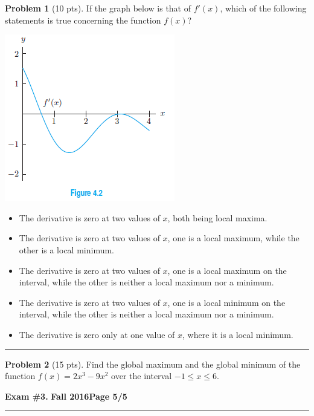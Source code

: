 \documentclass[12pt]{article}
\makeatletter
\theoremstyle{definition}
\newtheorem{problem}{Problem}
\newcommand*{\radiobutton}{%
  \@ifstar{\@radiobutton0}{\@radiobutton1}%
}
\newcommand*{\@radiobutton}[1]{%
  \begin{tikzpicture}
    \pgfmathsetlengthmacro\radius{height("X")/2}
    \draw[radius=\radius] circle;
    \ifcase#1 \fill[radius=.6*\radius] circle;\fi
  \end{tikzpicture}%
}
\makeatother
\begin{document}
\begin{problem}[10 pts]
If the graph below is that of $f'(x)$, which of the following statements is true concerning the function $f(x)$?
\begin{center}
\includegraphics{3graph2}
\end{center}
\begin{itemize}
\item[\radiobutton] The derivative is zero at two values of $x$, both being local maxima.
\item[\radiobutton] The derivative is zero at two values of $x$, one is a local maximum, while the other is a local minimum.
\item[\radiobutton] The derivative is zero at two values of $x$, one is a local maximum on the interval, while the other is neither a local maximum nor a minimum.
\item[\radiobutton] The derivative is zero at two values of $x$, one is a local minimum on the interval, while the other is neither a local maximum nor a minimum.
\item[\radiobutton] The derivative is zero only at one value of $x$, where it is a local minimum.
\end{itemize}
\end{problem}

\hrule
\begin{problem}[15 pts]
Find the global maximum and the global minimum of the function $f(x) = 2x^3 - 9x^2$ over the interval $-1 \leq x \leq 6$.
\end{problem}
\newpage

\hfill{\large\bf Exam \#3.}\hfill{\large\bf
  Fall 2016}\hfill{\large\bf Page 5/5}\hrule

\bigskip
\end{document}

